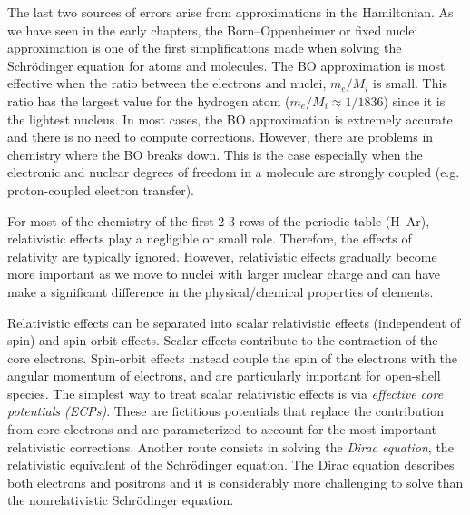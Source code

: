 \documentclass[../Main/chem371-notes.tex]{subfiles}
\begin{document}
The last two sources of errors arise from approximations in the Hamiltonian.
As we have seen in the early chapters, the Born--Oppenheimer or fixed nuclei approximation is one of the first simplifications made when solving the Schr\"{o}dinger equation for atoms and molecules.
The BO approximation is most effective when the ratio between the electrons and nuclei, $m_e / M_i$ is small.
This ratio has the largest value for the hydrogen atom ($m_e / M_i \approx 1/1836$) since it is the lightest nucleus.
In most cases, the BO approximation is extremely accurate and there is no need to compute corrections.
However, there are problems in chemistry where the BO breaks down.
This is the case especially when the electronic and nuclear degrees of freedom in a molecule are strongly coupled (e.g. proton-coupled electron transfer).

For most of the chemistry of the first 2-3 rows of the periodic table (H--Ar), relativistic effects play a negligible or small role.
Therefore, the effects of relativity are typically ignored.
However, relativistic effects gradually become more important as we move to nuclei with larger nuclear charge and can have make a significant difference in the physical/chemical properties of elements.

Relativistic effects can be separated into scalar relativistic effects (independent of spin) and spin-orbit effects.
Scalar effects contribute to the contraction of the core electrons.
Spin-orbit effects instead couple the spin of the electrons with the angular momentum of electrons, and are particularly important for open-shell species.
The simplest way to treat scalar relativistic effects is via \emph{effective core potentials (ECPs)}.
These are fictitious potentials that replace the contribution from core electrons and are parameterized to account for the most important relativistic corrections.
Another route consists in solving the \emph{Dirac equation}, the relativistic equivalent of the Schr\"{o}dinger equation.
The Dirac equation describes both electrons and positrons and it is considerably more challenging to solve than the nonrelativistic Schr\"{o}dinger equation.
\end{document}
